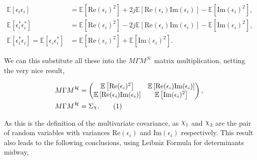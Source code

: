 \documentclass[honours,12pt]{unswthesis}
\newcommand{\E}{\mathbb{E}}
\newcommand{\ct}{\mathcal{H}}
\DeclareRobustCommand{\Chi}{{\mathpalette\irchi\relax}}
\newcommand{\irchi}[2]{\raisebox{\depth}{$#1\chi$}} %
\newcommand\numberthis{\addtocounter{equation}{1}\tag{\theequation}}
\numberwithin{equation}{section}
\begin{document}
\begin{align*}
    \E \left[ \epsilon_{i} \epsilon_{i} \right] &= \E \left[ \text{Re} ( \epsilon_{i} )^{2} \right] + 2 j \E \left[ \text{Re} ( \epsilon_{i} ) \text{Im} ( \epsilon_{i} ) \right] - \E \left[ \text{Im} ( \epsilon_{i} )^{2} \right],\\
    \E \left[ \epsilon_{i}^{*} \epsilon_{i}^{*} \right] &= \E \left[ \text{Re} ( \epsilon_{i} )^{2} \right] - 2 j \E \left[ \text{Re} ( \epsilon_{i} ) \text{Im} ( \epsilon_{i} ) \right] - \E \left[ \text{Im} ( \epsilon_{i} )^{2} \right],\\
    \E \left[ \epsilon_{i}^{*} \epsilon_{i} \right] = \E \left[ \epsilon_{i} \epsilon_{i}^{*} \right] &= \E \left[ \text{Re} ( \epsilon_{i} )^{2} \right] + \E \left[ \text{Im} ( \epsilon_{i} )^{2} \right].
\end{align*}

\noindent We can this substitute all these into the $M \Gamma M^{\ct}$ matrix multiplication, netting the very nice result,

\begin{align*}
	M \Gamma M^{\ct} &= 
	\begin{pmatrix} 
		\E \left[ \text{Re} ( \epsilon_{i} )^{2} \right] & \E \left[ \text{Re} ( \epsilon_{i} ) \text{Im} ( \epsilon_{i} ) \right] \\
		\E \left[ \text{Re} ( \epsilon_{i} ) \text{Im} ( \epsilon_{i} ) \right] & \E \left[ \text{Im} ( \epsilon_{i} )^{2} \right]
	\end{pmatrix}, \\
	M \Gamma M^{\ct} &= \Sigma_{\Chi}. \numberthis \label{MVTN_CN_cov}
\end{align*}

\noindent As this is the definition of the multivariate covariance, as $\Chi_{1}$ and $\Chi_{2}$ are the pair of random variables with variances $\text{Re} ( \epsilon_{i} )$ and $\text{Im} ( \epsilon_{i} )$ respectively. This result also leads to the following conclusions, using Leibniz Formula for determinants midway,
\end{document}
